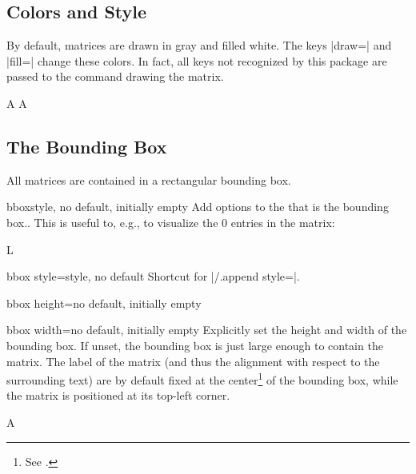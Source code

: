 \subsection{Colors and Style}

By default, matrices are drawn in gray and filled white.  The \TikZ keys
|draw=| and |fill=| change these colors.  In fact, all
keys not recognized by this package are passed to the \TikZ {} command
drawing the matrix.
\begin{dispExample}
   \drawmatrix[fill=yellow, draw=blue]A
   A
\end{dispExample}


\subsection{The Bounding Box}

All matrices are contained in a rectangular bounding box.  

\begin{docDmKey}{bbox}{}{style, no default, initially empty}
    Add options to the \TikZ {} that is the bounding box..
    This is useful to, e.g., to visualize the 0 entries in the matrix:
    \begin{dispExample}
        \drawmatrix[lower, bbox/.append style={fill=blue!10}]L
    \end{dispExample}
\end{docDmKey}
\begin{docDmKey}{bbox style}{=}{style, no default}
    Shortcut for |/.append style=|.
\end{docDmKey}


\begin{docDmKey}[][docmulti]{bbox height}{=}{no default, initially empty}
\end{docDmKey}
\begin{docDmKey}{bbox width}{=}{no default, initially empty}
    Explicitly set the height and width of the bounding box.
    If unset, the bounding box is just large enough to contain the matrix.
    The label of the matrix (and thus the alignment with respect to the
    surrounding text) are by default fixed at the center\footnote{See
    .} of the bounding box, while the matrix is
    positioned at its top-left corner.
    \begin{dispExample}

        \drawmatrix[bbox width=2, bbox height=1.5]A
    \end{dispExample}
\end{docDmKey}

